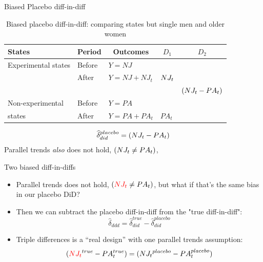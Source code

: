 \documentclass{beamer}
\begin{document}
\begin{frame}{Biased Placebo diff-in-diff}

\begin{table}\centering
\scriptsize
		\caption{Biased placebo diff-in-diff: comparing states but single men and older women}
		\begin{center}
		\begin{tabular}{lll|lc}
		\toprule
		\multicolumn{1}{l}{\textbf{States}}&
		\multicolumn{1}{c}{\textbf{Period}}&
		\multicolumn{1}{c}{\textbf{Outcomes}}&
		\multicolumn{1}{c}{$D_1$}&
		\multicolumn{1}{c}{$D_2$}\\
		\midrule
		Experimental states & Before & $Y=NJ$ \\
		& After & $Y=NJ + NJ_t $ & $\textcolor{black}{NJ_t}$\\
		\midrule
		& & & & $ (\textcolor{black}{NJ_t}- PA_t)$ \\
		\midrule
		Non-experimental  & Before & $Y=PA$ \\
		states& After & $Y=PA + PA_t$ & $PA_t$\\
		\bottomrule
		\end{tabular}
		\end{center}
	\end{table}

\begin{eqnarray*}
\widehat{\delta}^{placebo}_{did} = (\textcolor{black}{NJ_t}- PA_t)
\end{eqnarray*}Parallel trends \emph{also} does not hold, $(\textcolor{black}{NJ_t} \neq PA_t)$,

\end{frame}


\begin{frame}{Two biased diff-in-diffs}

\begin{itemize}


\item Parallel trends does not hold, $(\textcolor{red}{NJ_t} \neq PA_t)$, but what if that's the same bias in our placebo DiD?
\item Then we can subtract the placebo diff-in-diff from the "true diff-in-diff": $$ \widehat{\delta}_{ddd} = \widehat{\delta}^{true}_{did} - \widehat{\delta}^{placebo}_{did}$$
\item Triple differences is a ``real design'' with one parallel trends assumption: $$(\textcolor{red}{NJ_t}^{true}- PA_t^{true}) = (\textcolor{black}{NJ_t}^{placebo}- PA_t^{placebo})$$

\end{itemize}

\end{frame}
\end{document}
